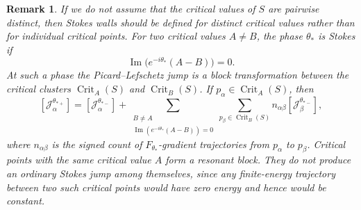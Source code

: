 \documentclass[11pt]{amsart}
\theoremstyle{plain}
\newtheorem{rmk}[thm]{Remark}
\newcommand{\im}{\operatorname{Im}}
\begin{document}
\begin{rmk}
If we do not assume that the critical values of \(S\) are pairwise distinct, then Stokes walls should be defined for distinct critical values rather 
than for individual critical points.  For two critical values \(A\neq B\), the 
phase \(\theta_*\) is Stokes if
\[
\im\bigl(e^{-i\theta_*}(A-B)\bigr)=0.
\]
At such a phase the Picard--Lefschetz jump is a block transformation between the 
critical clusters \(\operatorname{Crit}_A(S)\) and \(\operatorname{Crit}_B(S)\). 
If \(p_\alpha\in \operatorname{Crit}_A(S)\), then
\[
[\mathcal J_\alpha^{\theta_{*+}}]
=
[\mathcal J_\alpha^{\theta_{*-}}]
+
\sum_{\substack{B\neq A\\
\operatorname{Im}(e^{-i\theta_*}(A-B))=0}}
\sum_{p_\beta\in\operatorname{Crit}_B(S)}
n_{\alpha\beta}
[\mathcal J_\beta^{\theta_{*-}}],
\]
where \(n_{\alpha\beta}\) is the signed count of \(F_{\theta_*}\)-gradient
trajectories from \(p_\alpha\) to \(p_\beta\).  Critical points with the same
critical value \(A\) form a resonant block.  They do not produce an ordinary
Stokes jump among themselves, since any finite-energy trajectory between two
such critical points would have zero energy and hence would be constant.  
\end{rmk}

\smallskip
\end{document}
